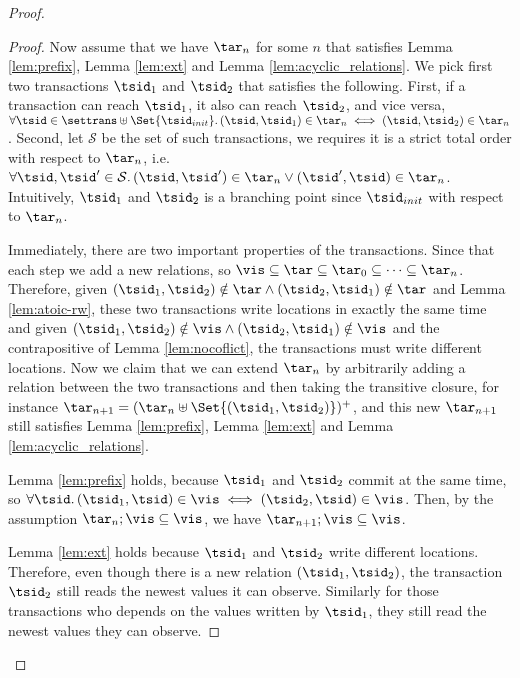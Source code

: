 \begin{proof}
\begin{proof}
    Now assume that we have \( \tar_{n} \) for some \( n \) that satisfies Lemma \ref{lem:prefix}, Lemma \ref{lem:ext} and Lemma \ref{lem:acyclic_relations}.
    We pick first two transactions \( \tsid_{1} \) and \( \tsid_{2} \) that satisfies the following.
    First, if a transaction can reach \( \tsid_{1} \), it also can reach \( \tsid_{2} \), and vice versa, \( \forall \tsid \in \settrans \uplus \Set{\tsid_{init}} \ldotp (\tsid, \tsid_{1}) \in \tar_{n} \iff (\tsid, \tsid_{2}) \in \tar_{n} \).
    Second, let \( \mathcal{S} \) be the set of such transactions, we requires it is a strict total order with respect to \( \tar_{n} \), i.e.\ \( \forall \tsid, \tsid' \in \mathcal{S} \ldotp (\tsid,\tsid') \in \tar_{n} \lor (\tsid',\tsid) \in \tar_{n}  \).
    Intuitively, \( \tsid_{1} \) and \( \tsid_{2} \) is a branching point since \( \tsid_{init} \) with respect to \( \tar_{n} \).

    Immediately, there are two important properties of the transactions.
    Since that each step we add a new relations, so \( \vis \subseteq \tar \subseteq \tar_{0} \subseteq \dots \subseteq \tar_{n} \).
    Therefore, given \( ( \tsid_{1}, \tsid_{2} ) \notin \tar \land ( \tsid_{2}, \tsid_{1} ) \notin \tar \) and Lemma \ref{lem:atoic-rw}, these two transactions write locations in exactly the same time and given \( ( \tsid_{1}, \tsid_{2} ) \notin \vis \land ( \tsid_{2}, \tsid_{1} ) \notin \vis \) and the contrapositive of Lemma \ref{lem:nocoflict}, the transactions must write different locations.
    Now we claim that we can extend \( \tar_{n} \) by arbitrarily adding a relation between the two transactions and then taking the transitive closure, for instance \( \tar_{n+1} = ( \tar_{n} \uplus \Set{(\tsid_{1}, \tsid_{2})} )^{+}  \), and this new \( \tar_{n+1} \) still satisfies Lemma \ref{lem:prefix}, Lemma \ref{lem:ext} and Lemma \ref{lem:acyclic_relations}.

    Lemma \ref{lem:prefix}  holds, because \( \tsid_{1} \) and \( \tsid_{2} \) commit at the same time, so \( \forall \tsid \ldotp (\tsid_{1}, \tsid) \in \vis \iff  (\tsid_{2}, \tsid) \in \vis \).
    Then, by the assumption \( \tar_{n} ; \vis \subseteq \vis \), we have \( \tar_{n+1} ; \vis \subseteq \vis \).

    Lemma \ref{lem:ext} holds because \( \tsid_{1} \) and \( \tsid_{2} \) write different locations.
    Therefore, even though there is a new relation \( (\tsid_{1}, \tsid_{2}) \), the transaction \( \tsid_{2} \) still reads the newest values it can observe.
    Similarly for those transactions who depends on the values written by \( \tsid_{1} \), they still read the newest values they can observe.
                                                   

\end{proof}
\end{proof}
